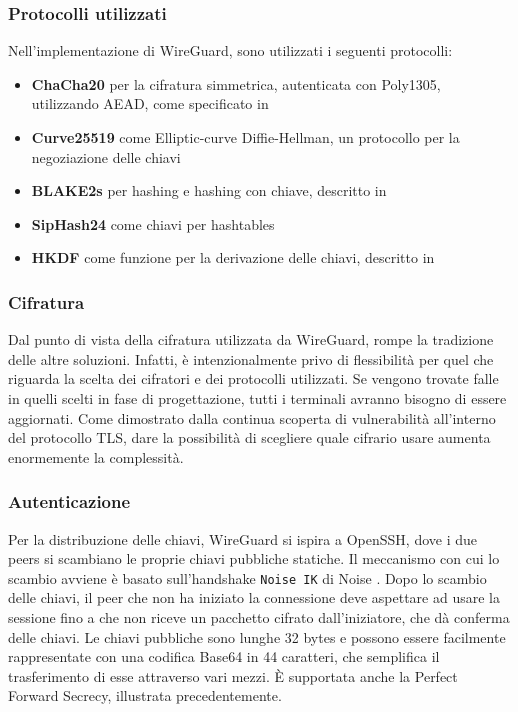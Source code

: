 \subsubsection{Protocolli utilizzati}
Nell'implementazione di WireGuard, sono utilizzati i seguenti protocolli:
\begin{itemize}
    \item \textbf{ChaCha20} per la cifratura simmetrica, autenticata con Poly1305, utilizzando AEAD, come specificato in \cite[RFC7539]{RFC7539}
    \item \textbf{Curve25519} come Elliptic-curve Diffie-Hellman, un protocollo per la negoziazione delle chiavi
    \item \textbf{BLAKE2s} per hashing e hashing con chiave, descritto in \cite[RFC7693]{RFC7693}
    \item \textbf{SipHash24} come chiavi per hashtables
    \item \textbf{HKDF} come funzione per la derivazione delle chiavi, descritto in \cite[RFC5869]{RFC5869}
\end{itemize}

\subsubsection{Cifratura}
Dal punto di vista della cifratura utilizzata da WireGuard, rompe la tradizione delle altre soluzioni. Infatti, è intenzionalmente privo di flessibilità per quel che riguarda la scelta dei cifratori e dei protocolli utilizzati. Se vengono trovate falle in quelli scelti in fase di progettazione, tutti i terminali avranno bisogno di essere aggiornati. Come dimostrato dalla continua scoperta di vulnerabilità all'interno del protocollo TLS, dare la possibilità di scegliere quale cifrario usare aumenta enormemente la complessità.

\subsubsection{Autenticazione}
Per la distribuzione delle chiavi, WireGuard si ispira a OpenSSH, dove i due peers si scambiano le proprie chiavi pubbliche statiche. Il meccanismo con cui lo scambio avviene è basato sull'handshake \texttt{Noise IK} di Noise \cite{Noise}. Dopo lo scambio delle chiavi, il peer che non ha iniziato la connessione deve aspettare ad usare la sessione fino a che non riceve un pacchetto cifrato dall'iniziatore, che dà conferma delle chiavi.
Le chiavi pubbliche sono lunghe 32 bytes e possono essere facilmente rappresentate con una codifica Base64 in 44 caratteri, che semplifica il trasferimento di esse attraverso vari mezzi. È supportata anche la Perfect Forward Secrecy, illustrata precedentemente.

